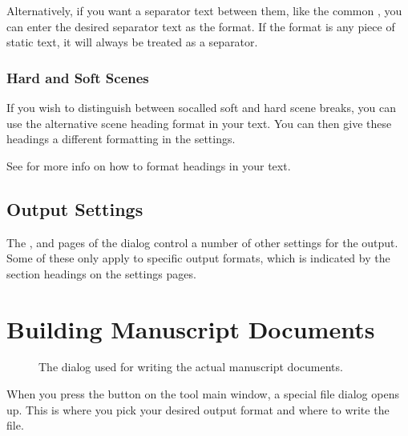 \documentclass[a4paper,11pt,english]{sphinxmanual}
\begin{document}
\sphinxAtStartPar
Alternatively, if you want a separator text between them, like the common \sphinxcode{\sphinxupquote{* * *}}, you can enter
the desired separator text as the format. If the format is any piece of static text, it will always
be treated as a separator.


\subsubsection{Hard and Soft Scenes}
\label{\detokenize{project_manuscript:hard-and-soft-scenes}}\label{\detokenize{project_manuscript:a-manuscript-settings-head-hard}}
\sphinxAtStartPar
If you wish to distinguish between so\sphinxhyphen{}called soft and hard scene breaks, you can use the
alternative scene heading format in your text. You can then give these headings a different
formatting in the  settings.

\sphinxAtStartPar
See {\hyperref[\detokenize{usage_format:a-fmt-head}]{}} for more info on how to format headings in your text.


\subsection{Output Settings}
\label{\detokenize{project_manuscript:output-settings}}
\sphinxAtStartPar
The ,  and  pages of the  dialog
control a number of other settings for the output. Some of these only apply to specific output
formats, which is indicated by the section headings on the settings pages.


\section{Building Manuscript Documents}
\label{\detokenize{project_manuscript:building-manuscript-documents}}\label{\detokenize{project_manuscript:a-manuscript-build}}
\begin{figure}[htbp]
\centering
\capstart

\noindent{}
\caption{The  dialog used for writing the actual manuscript documents.}\label{\detokenize{project_manuscript:id5}}\end{figure}

\sphinxAtStartPar
When you press the  button on the  tool main window, a special
file dialog opens up. This is where you pick your desired output format and where to write the
file.
\end{document}
